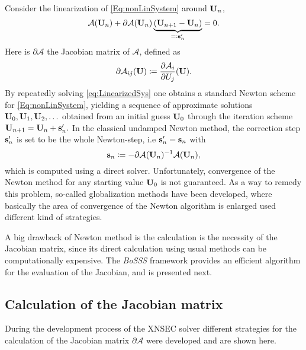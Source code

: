 Consider the linearization of \cref{Eq:nonLinSystem} around $\textbf{U}_n$,
\begin{equation}
	\mathcal{A}(\textbf{U}_{n}) +
	\partial \mathcal{A} (\textbf{U}_n) \underbrace{ ( \textbf{U}_{n+1} -  \textbf{U}_{n} ) }_{=: \textbf{s}'_n }
	= 0.
	\label{eq:LinearizedSys}
\end{equation}
Here is $\partial \mathcal{A}$ the Jacobian matrix of $\mathcal{A}$, defined as
\begin{equation}
	\partial \mathcal{A}_{ij}(\textbf{U}) \coloneqq \frac{\partial \mathcal{A}_i}{\partial U_j}(\textbf{U}).
	\label{Eq:Jacobian}
\end{equation}
By repeatedly solving \cref{eq:LinearizedSys} one obtains a standard Newton scheme for \cref{Eq:nonLinSystem}, yielding a sequence of approximate solutions $\textbf{U}_0, \textbf{U}_1, \textbf{U}_2, \ldots$ obtained from an initial guess $\textbf{U}_0$ through the iteration scheme $ \textbf{U}_{n+1} =\textbf{U}_n + \textbf{s}'_n.$
In the classical undamped Newton method, the correction step $\textbf{s}'_n$ is set to be the whole Newton-step, i.e  $\textbf{s}'_n = \textbf{s}_n$ with
\begin{equation}
	\textbf{s}_n  \coloneqq - \partial \mathcal{A}(\textbf{U}_n)^{-1}\mathcal{A}(\textbf{U}_n),
	\label{eq:NewtonStep}
\end{equation}
which is computed using a direct solver. Unfortunately, convergence of the Newton method for any starting value $\textbf{U}_0$ is not guaranteed. As a way to remedy this problem, so-called globalization methods have been developed, where basically the area of convergence of the Newton algorithm is enlarged used different kind of strategies.  

A big drawback of Newton method is the calculation is the necessity of the Jacobian matrix, since its direct calculation using usual methods can be computationally expensive. The \textit{BoSSS} framework provides an efficient algorithm for the evaluation of the Jacobian, and is presented next.

\subsection{Calculation of the Jacobian matrix} \label{ssec:EvalJacobian}
During the development process of the XNSEC solver different strategies for the calculation of the Jacobian matrix $\partial \mathcal{A}$ were developed and are shown here. 

